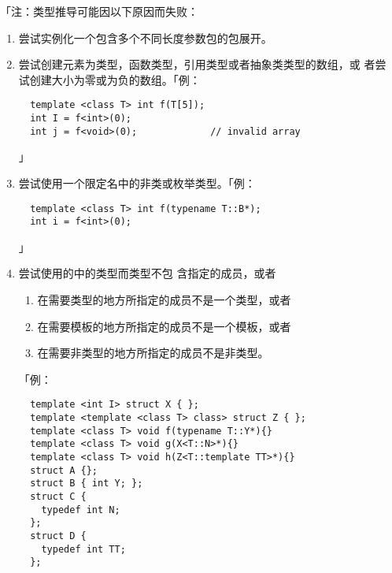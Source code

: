 「注：类型推导可能因以下原因而失败：
\begin{enumerate}
  \item{尝试实例化一个包含多个不同长度参数包的包展开。}
  \item{尝试创建元素为类型，函数类型，引用类型或者抽象类类型的数组，或
    者尝试创建大小为零或为负的数组。「例：
\begin{lstlisting}
  template <class T> int f(T[5]);
  int I = f<int>(0);
  int j = f<void>(0);             // invalid array
\end{lstlisting}」}
  \item{尝试使用一个限定名中的非类或枚举类型。「例：
\begin{lstlisting}
  template <class T> int f(typename T::B*);
  int i = f<int>(0);
\end{lstlisting}」}
  \item{尝试使用的中的类型而类型不包
    含指定的成员，或者
    \begin{enumerate}
      \item{在需要类型的地方所指定的成员不是一个类型，或者}
      \item{在需要模板的地方所指定的成员不是一个模板，或者}
      \item{在需要非类型的地方所指定的成员不是非类型。}
    \end{enumerate}
    「例：
\begin{lstlisting}
  template <int I> struct X { };
  template <template <class T> class> struct Z { };
  template <class T> void f(typename T::Y*){}
  template <class T> void g(X<T::N>*){}
  template <class T> void h(Z<T::template TT>*){}
  struct A {};
  struct B { int Y; };
  struct C {
    typedef int N;
  };
  struct D {
    typedef int TT;
  };


\end{lstlisting}}
\end{enumerate}
